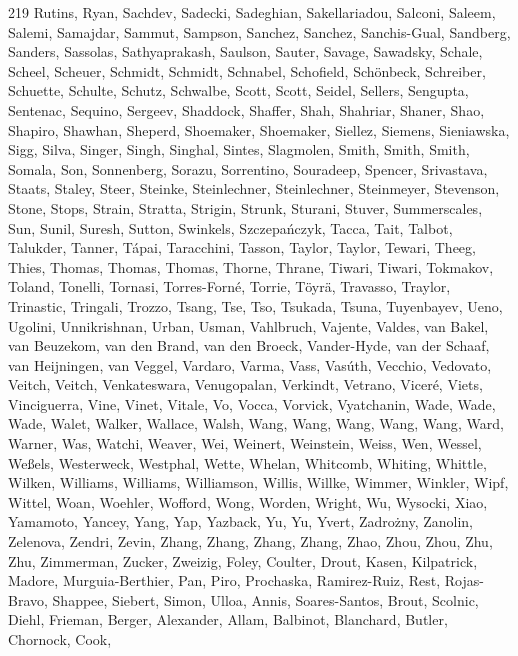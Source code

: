 \documentclass{aa}
\begin{document}
\begin{thebibliography}{219}
{		{Rutins}, {Ryan}, {Sachdev}, {Sadecki}, {Sadeghian}, {Sakellariadou}, {Salconi}, {Saleem}, {Salemi}, {Samajdar}, {Sammut}, {Sampson}, {Sanchez}, {Sanchez}, {Sanchis-Gual}, {Sandberg}, {Sanders}, {Sassolas}, {Sathyaprakash}, {Saulson}, {Sauter}, {Savage}, {Sawadsky}, {Schale}, {Scheel}, {Scheuer}, {Schmidt}, {Schmidt}, {Schnabel}, {Schofield}, {Sch{\"o}nbeck}, {Schreiber}, {Schuette}, {Schulte}, {Schutz}, {Schwalbe}, {Scott}, {Scott}, {Seidel}, {Sellers}, {Sengupta}, {Sentenac}, {Sequino}, {Sergeev}, {Shaddock}, {Shaffer}, {Shah}, {Shahriar}, {Shaner}, {Shao}, {Shapiro}, {Shawhan}, {Sheperd}, {Shoemaker}, {Shoemaker}, {Siellez}, {Siemens}, {Sieniawska}, {Sigg}, {Silva}, {Singer}, {Singh}, {Singhal}, {Sintes}, {Slagmolen}, {Smith}, {Smith}, {Smith}, {Somala}, {Son}, {Sonnenberg}, {Sorazu}, {Sorrentino}, {Souradeep}, {Spencer}, {Srivastava}, {Staats}, {Staley}, {Steer}, {Steinke}, {Steinlechner}, {Steinlechner}, {Steinmeyer}, {Stevenson}, {Stone}, {Stops}, {Strain}, {Stratta}, {Strigin}, {Strunk}, {Sturani},
		{Stuver}, {Summerscales}, {Sun}, {Sunil}, {Suresh}, {Sutton}, {Swinkels}, {Szczepa{\'n}czyk}, {Tacca}, {Tait}, {Talbot}, {Talukder}, {Tanner}, {T{\'a}pai}, {Taracchini}, {Tasson}, {Taylor}, {Taylor}, {Tewari}, {Theeg}, {Thies}, {Thomas}, {Thomas}, {Thomas}, {Thorne}, {Thrane}, {Tiwari}, {Tiwari}, {Tokmakov}, {Toland}, {Tonelli}, {Tornasi}, {Torres-Forn{\'e}}, {Torrie}, {T{\"o}yr{\"a}}, {Travasso}, {Traylor}, {Trinastic}, {Tringali}, {Trozzo}, {Tsang}, {Tse}, {Tso}, {Tsukada}, {Tsuna}, {Tuyenbayev}, {Ueno}, {Ugolini}, {Unnikrishnan}, {Urban}, {Usman}, {Vahlbruch}, {Vajente}, {Valdes}, {van Bakel}, {van Beuzekom}, {van den Brand}, {van den Broeck}, {Vander-Hyde}, {van der Schaaf}, {van Heijningen}, {van Veggel}, {Vardaro}, {Varma}, {Vass}, {Vas{\'u}th}, {Vecchio}, {Vedovato}, {Veitch}, {Veitch}, {Venkateswara}, {Venugopalan}, {Verkindt}, {Vetrano}, {Vicer{\'e}}, {Viets}, {Vinciguerra}, {Vine}, {Vinet}, {Vitale}, {Vo}, {Vocca}, {Vorvick}, {Vyatchanin}, {Wade}, {Wade}, {Wade}, {Walet}, {Walker}, {Wallace},
		{Walsh}, {Wang}, {Wang}, {Wang}, {Wang}, {Wang}, {Ward}, {Warner}, {Was}, {Watchi}, {Weaver}, {Wei}, {Weinert}, {Weinstein}, {Weiss}, {Wen}, {Wessel}, {We{\ss}els}, {Westerweck}, {Westphal}, {Wette}, {Whelan}, {Whitcomb}, {Whiting}, {Whittle}, {Wilken}, {Williams}, {Williams}, {Williamson}, {Willis}, {Willke}, {Wimmer}, {Winkler}, {Wipf}, {Wittel}, {Woan}, {Woehler}, {Wofford}, {Wong}, {Worden}, {Wright}, {Wu}, {Wysocki}, {Xiao}, {Yamamoto}, {Yancey}, {Yang}, {Yap}, {Yazback}, {Yu}, {Yu}, {Yvert}, {Zadro{\.z}ny}, {Zanolin}, {Zelenova}, {Zendri}, {Zevin}, {Zhang}, {Zhang}, {Zhang}, {Zhang}, {Zhao}, {Zhou}, {Zhou}, {Zhu}, {Zhu}, {Zimmerman}, {Zucker}, {Zweizig}, {Foley}, {Coulter}, {Drout}, {Kasen}, {Kilpatrick}, {Madore}, {Murguia-Berthier}, {Pan}, {Piro}, {Prochaska}, {Ramirez-Ruiz}, {Rest}, {Rojas-Bravo}, {Shappee}, {Siebert}, {Simon}, {Ulloa}, {Annis}, {Soares-Santos}, {Brout}, {Scolnic}, {Diehl}, {Frieman}, {Berger}, {Alexander}, {Allam}, {Balbinot}, {Blanchard}, {Butler}, {Chornock}, {Cook},
}
\end{thebibliography}
\end{document}
